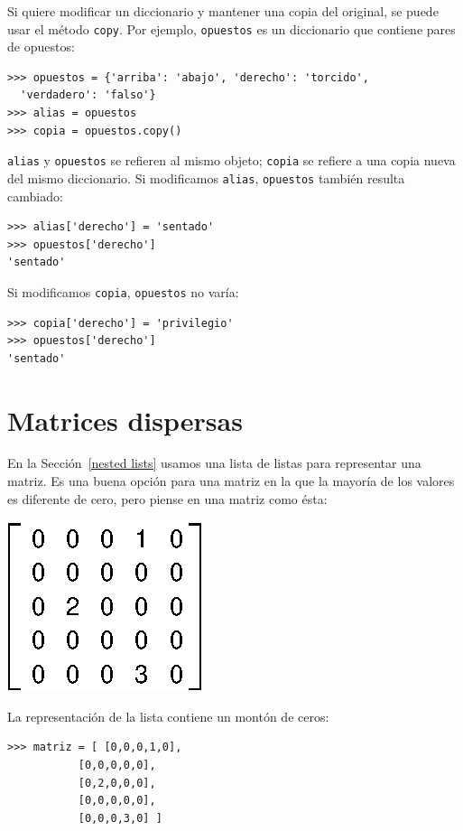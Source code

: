 Si quiere modificar un diccionario y mantener una copia del original,
se puede usar el método \texttt{copy}. Por ejemplo, \texttt{opuestos}
es un diccionario que contiene pares de opuestos:
\begin{verbatim}
>>> opuestos = {'arriba': 'abajo', 'derecho': 'torcido', 
  'verdadero': 'falso'}
>>> alias = opuestos
>>> copia = opuestos.copy()
\end{verbatim}

\texttt{alias} y \texttt{opuestos} se refieren al mismo objeto; \texttt{copia}
se refiere a una copia nueva del mismo diccionario. Si modificamos
\texttt{alias}, \texttt{opuestos} también resulta cambiado:
\begin{verbatim}
>>> alias['derecho'] = 'sentado'
>>> opuestos['derecho']
'sentado'
\end{verbatim}

Si modificamos \texttt{copia}, \texttt{opuestos} no varía:
\begin{verbatim}
>>> copia['derecho'] = 'privilegio'
>>> opuestos['derecho']
'sentado'
\end{verbatim}

\section{Matrices dispersas}

  

En la Sección~\ref{nested lists} usamos una lista de listas para
representar una matriz. Es una buena opción para una matriz en la
que la mayoría de los valores es diferente de cero, pero piense en
una matriz como ésta:

\beforefig\centerline{\includegraphics{illustrations/sparse}}

La representación de la lista contiene un montón de ceros:
\begin{verbatim}
>>> matriz = [ [0,0,0,1,0],
           [0,0,0,0,0],
           [0,2,0,0,0],
           [0,0,0,0,0],
           [0,0,0,3,0] ]
\end{verbatim}

